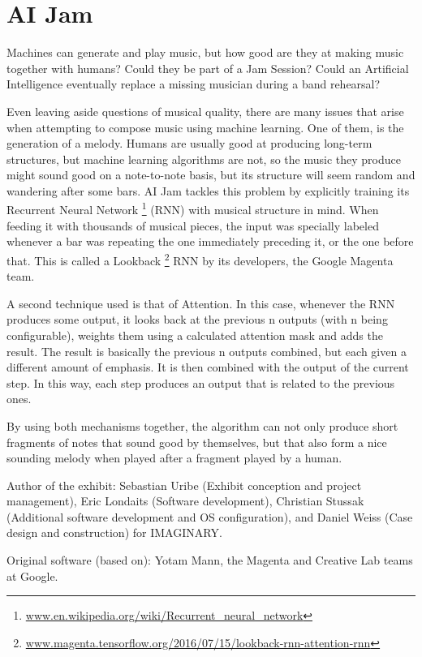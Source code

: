 \section{AI Jam}
Machines can generate and play music, but how good are they at making music together with humans? Could they be part of a Jam Session? Could an Artificial Intelligence eventually replace a missing musician during a band rehearsal?

Even leaving aside questions of musical quality, there are many issues that arise when attempting to compose music using machine learning. One of them, is the generation of a melody. Humans are usually good at producing long-term structures, but machine learning algorithms are not, so the music they produce might sound good on a note-to-note basis, but its structure will seem random and wandering after some bars. AI Jam tackles this problem by explicitly training its Recurrent Neural Network \footnote{\url{www.en.wikipedia.org/wiki/Recurrent_neural_network}} (RNN) with musical structure in mind. When feeding it with thousands of musical pieces, the input was specially labeled whenever a bar was repeating the one immediately preceding it, or the one before that. This is called a Lookback \footnote{\url{www.magenta.tensorflow.org/2016/07/15/lookback-rnn-attention-rnn}} RNN by its developers, the Google Magenta team.

A second technique used is that of Attention. In this case, whenever the RNN produces some output, it looks back at the previous n outputs (with n being configurable), weights them using a calculated attention mask and adds the result. The result is basically the previous n outputs combined, but each given a different amount of emphasis. It is then combined with the output of the current step. In this way, each step produces an output that is related to the previous ones.

By using both mechanisms together, the algorithm can not only produce short fragments of notes that sound good by themselves, but that also form a nice sounding melody when played after a fragment played by a human.

\begin{sectcredits}


\item[Author of the exhibit:] Sebastian Uribe (Exhibit conception and project management), Eric Londaits (Software development), Christian Stussak (Additional software development and OS configuration), and Daniel Weiss (Case design and construction) for IMAGINARY.
\item[Original software (based on):] Yotam Mann, the Magenta and Creative Lab teams at Google.
\end{sectcredits}
